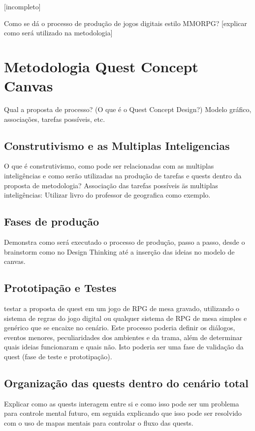 \documentclass[
	12pt,				%
	openright,			%
	twoside,			%
	a4paper,			%
	english,			%
	french,				%
	spanish,			%
	brazil				%
	]{abntex2}
\begin{document}
[incompleto]


Como se dá o processo de produção de jogos digitais estilo MMORPG?
[explicar como será utilizado na metodologia]


\chapter{Metodologia Quest Concept Canvas}

Qual a proposta de processo? (O que é o Quest Concept Design?) Modelo gráfico, associações, tarefas possíveis, etc.

\section{Construtivismo e as Multiplas Inteligencias}
O que é construtivismo, como pode ser relacionadas com as multiplas inteligências e como serão utilizadas na produção de tarefas e quests dentro da proposta de metodologia? Associação das tarefas possíveis äs multiplas inteligências: Utilizar livro do professor de geografica como exemplo.

\section{Fases de produção}
Demonstra como será executado o processo de produção, passo a passo, desde o brainstorm como no Design Thinking até a inserção das ideias no modelo de canvas.

\section{Prototipação e Testes}

testar a proposta de quest em um jogo de RPG de mesa gravado, utilizando o sistema de regras do jogo digital ou qualquer sistema de RPG de mesa simples e genérico que se encaixe no cenário. Este processo poderia definir os diálogos, eventos menores, peculiaridades dos ambientes e da trama, além de determinar quais ideias funcionaram e quais não. Isto poderia ser uma fase de validação da quest (fase de teste e prototipação).

\section{Organização das quests dentro do cenário total}

Explicar como as quests interagem entre si e como isso pode ser um problema para controle mental futuro, em seguida explicando que isso pode ser resolvido com o uso de mapas mentais para controlar o fluxo das quests.
\end{document}
